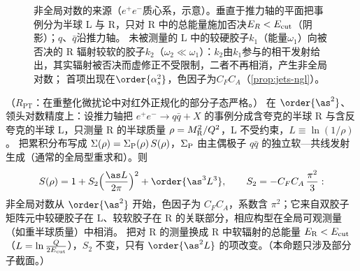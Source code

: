 \begin{figure}[htbp]
\caption{非全局对数的来源（$e^+e^-$质心系，示意）。垂直于推力轴的平面把事例分为半球 L 与 R，只对 R 中的总能量施加否决$E_R<E_{\rm cut}$（阴影）；$q$、$\bar q$沿推力轴。
未被测量的 L 中的较硬胶子$k_1$（能量$\omega_1$）向被否决的 R 辐射较软的胶子$k_2$（$\omega_2\ll\omega_1$）：$k_2$由$k_1$参与的相干发射给出，其实辐射被否决而虚修正不受限制，二者不再相消，产生非全局对数；
首项出现在$\order{\alpha_s^2}$，色因子为$C_FC_A$（\cref{prop:jets-ngl}）。}
\label{fig:jets-ngl}
\end{figure}

\begin{proposition}\label{prop:jets-ngl}
（$R_{\mathrm{PT}}$：在重整化微扰论中对红外正规化的部分子态严格。）
在 $\order{\as^2}$、领头对数精度上：设推力轴把 $e^+e^-\to q\bar q+X$ 的事例分成含夸克的半球 R 与含反夸克的半球 L，只测量 R 的半球质量 $\rho=M_{\rm R}^2/Q^2$，L 不受约束，$L\equiv\ln(1/\rho)$。
把累积分布写成 $\Sigma(\rho)=\Sigma_{\rm P}(\rho)\,S(\rho)$，$\Sigma_{\rm P}$ 由主偶极子 $q\bar q$ 的独立软—共线发射生成（通常的全局型重求和）。则
\begin{equation}\label{eq:jets-S2}
S(\rho)=1+S_2\Big(\frac{\as L}{2\pi}\Big)^2+\order{\as^3L^3},\qquad S_2=-C_FC_A\,\frac{\pi^2}{3}:
\end{equation}
非全局对数从 $\order{\as^2}$ 开始，色因子为 $C_FC_A$，系数含 $\pi^2$；它来自双胶子矩阵元中较硬胶子在 L、较软胶子在 R 的关联部分，相应构型在全局可观测量（如重半球质量）中相消。
把对 R 的测量换成 R 中软辐射的总能量 $E_{\rm R}<E_{\rm cut}$（$L=\ln\frac{Q}{2E_{\rm cut}}$），$S_2$ 不变，只有 $\order{\as^2L}$ 的项改变。（本命题只涉及部分子截面。）
\end{proposition}

